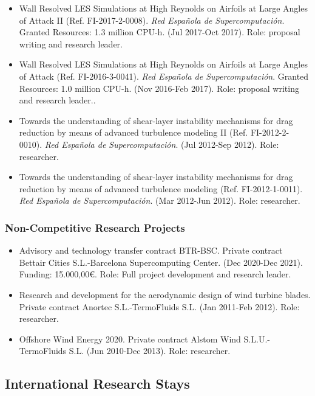 \documentclass{article}
\begin{document}
\begin{itemize}
\item Wall Resolved LES Simulations at High Reynolds on Airfoils at Large Angles of Attack II (Ref. FI-2017-2-0008). {\it Red Española de Supercomputación}. Granted Resources: 1.3 million CPU-h. (Jul 2017-Oct 2017). Role: proposal writing and research leader.

\item Wall Resolved LES Simulations at High Reynolds on Airfoils at Large Angles of Attack (Ref. FI-2016-3-0041). {\it Red Española de Supercomputación}. Granted Resources: 1.0 million CPU-h. (Nov 2016-Feb 2017). Role: proposal writing and research leader..

\item Towards the understanding of shear-layer instability mechanisms for drag reduction by means of advanced turbulence modeling II (Ref. FI-2012-2-0010). {\it Red Española de Supercomputación}. (Jul 2012-Sep 2012). Role: researcher.

\item Towards the understanding of shear-layer instability mechanisms for drag reduction by means of advanced turbulence modeling (Ref. FI-2012-1-0011). {\it Red Española de Supercomputación}. (Mar 2012-Jun 2012). Role: researcher.

\end{itemize}

\subsubsection{Non-Competitive Research Projects}
\begin{itemize}

\item Advisory and technology transfer contract BTR-BSC. Private contract Bettair Cities S.L.-Barcelona Supercomputing Center. (Dec 2020-Dec 2021). Funding: 15.000,00€. Role: Full project development and research leader.

\item Research and development for the aerodynamic design of wind turbine blades. Private contract Anortec S.L.-TermoFluids S.L. (Jan 2011-Feb 2012). Role: researcher.

\item Offshore Wind Energy 2020. Private contract Alstom Wind S.L.U.-TermoFluids S.L. (Jun 2010-Dec 2013). Role: researcher.

\end{itemize}

\subsection{International Research Stays}
\end{document}
